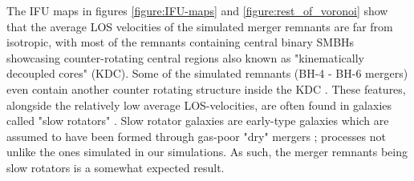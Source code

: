 \documentclass[english, oneside]{HYgradu}
\begin{document}
The IFU maps in figures \ref{figure:IFU-maps} and \ref{figure:rest_of_voronoi} show that the average LOS velocities of the simulated merger remnants are far from isotropic, with most of the remnants containing central binary SMBHs showcasing counter-rotating central regions also known as "kinematically decoupled cores" (KDC). Some of the simulated remnants (BH-4 - BH-6 mergers) even contain another counter rotating structure inside the KDC \citep{Rantala2019}. These features, alongside the relatively low average LOS-velocities, are often found in galaxies called "slow rotators" \citep{Emsellem2007}. Slow rotator galaxies are early-type galaxies which are assumed to have been formed through gas-poor "dry" mergers \citep{Emsellem2007, Cappellari2007}; processes not unlike the ones simulated in our simulations. As such, the merger remnants being slow rotators is a somewhat expected result.
\end{document}
